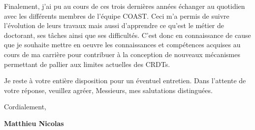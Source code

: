 \documentclass[11pt,a4paper,sans]{moderncv}        %
\newcommand{\tab}{\quad \quad}
\begin{document}
\tab Finalement, j'ai pu au cours de ces trois dernières années
échanger au quotidien avec les différents membres de l'équipe COAST.
Ceci m'a permis de suivre l'évolution de leurs travaux
mais aussi d'apprendre ce qu'est le métier de doctorant,
ses tâches ainsi que ses difficultés.
C'est donc en connaissance de cause que je souhaite mettre en oeuvre
les connaissances et compétences acquises au cours de ma carrière
pour contribuer à la conception de nouveaux mécanismes
permettant de pallier aux limites actuelles des CRDTs.


\tab Je reste à votre entière disposition pour un éventuel entretien. Dans l'attente de votre réponse, veuillez agréer, Messieurs, mes salutations distinguées.


Cordialement,\\
\begin{flushright}
\textbf{Matthieu Nicolas}
\end{flushright}
\end{document}
